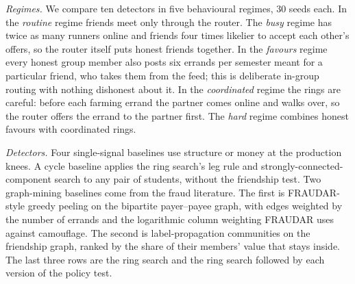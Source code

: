 \emph{Regimes.} We compare ten detectors in five behavioural regimes, 30 seeds each.
In the \emph{routine} regime friends meet only through the router. The \emph{busy}
regime has twice as many runners online and friends four times likelier to accept
each other's offers, so the router itself puts honest friends together. In the
\emph{favours} regime every honest group member also posts six errands per semester
meant for a particular friend, who takes them from the feed; this is deliberate
in-group routing with nothing dishonest about it. In the \emph{coordinated} regime the
rings are careful: before each farming errand the partner comes online and walks
over, so the router offers the errand to the partner first. The \emph{hard} regime
combines honest favours with coordinated rings.

\emph{Detectors.} Four single-signal baselines use structure or money at the
production knees. A cycle baseline applies the ring search's leg rule and
strongly-connected-component search to any pair of students, without the friendship
test. Two graph-mining baselines come from the fraud literature. The first is
FRAUDAR-style greedy peeling \cite{hooi2016fraudar,charikar2000dense} on the
bipartite payer--payee graph, with edges weighted by the number of errands and the
logarithmic column weighting FRAUDAR uses against camouflage. The second is
label-propagation communities \cite{raghavan2007lpa} on the friendship graph, ranked
by the share of their members' value that stays inside. The last three rows are the
ring search and the ring search followed by each version of the policy test.

